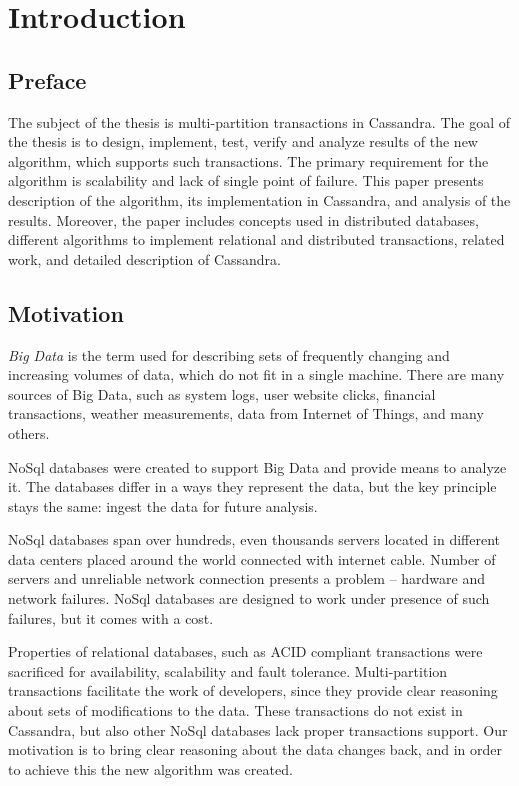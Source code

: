 
\chapter{Introduction}\label{chapter:introduction}

\section{Preface}\label{sec:introduction:preface}
The subject of the thesis is multi-partition transactions in Cassandra. 
The goal of the thesis is to design, implement, test, verify and analyze results of the new algorithm, which supports such transactions. The primary requirement for the algorithm is scalability and lack of single point of failure. This paper presents description of the algorithm, its implementation in Cassandra, and analysis of the results. Moreover, the paper includes concepts used in distributed databases, different algorithms to implement relational and distributed transactions, related work, and detailed description of Cassandra.

\section{Motivation}\label{sec:introduction:motivation}
\emph{Big Data} is the term used for describing sets of frequently changing and increasing volumes of data, which do not fit in a single machine. There are many sources of Big Data, such as system logs, user website clicks, financial transactions, weather measurements, data from Internet of Things, and many others. 

NoSql databases were created to support Big Data and provide means to analyze it. The databases differ in a ways they represent the data, but the key principle stays the same: ingest the data for future analysis.

NoSql databases span over hundreds, even thousands servers located in different data centers placed around the world connected with internet cable. Number of servers and unreliable network connection presents a problem -- hardware and network failures.
NoSql databases are designed to work under presence of such failures, but it comes with a cost.

Properties of relational databases, such as ACID compliant transactions were sacrificed for availability, scalability and fault tolerance. Multi-partition transactions facilitate the work of developers, since they provide clear reasoning about sets of modifications to the data. These transactions do not exist in Cassandra, but also other NoSql databases lack proper transactions support.
Our motivation is to bring clear reasoning about the data changes back, and in order to achieve this the new algorithm was created.

